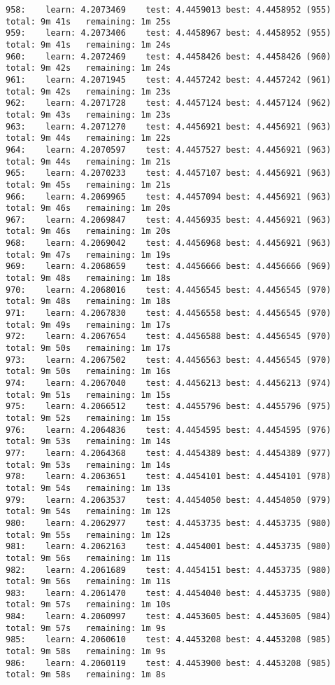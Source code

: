 \documentclass[11pt]{article}
\begin{document}
\begin{Verbatim}[commandchars=\\\{\}]
958:	learn: 4.2073469	test: 4.4459013	best: 4.4458952 (955)	total: 9m 41s	remaining: 1m 25s
959:	learn: 4.2073406	test: 4.4458967	best: 4.4458952 (955)	total: 9m 41s	remaining: 1m 24s
960:	learn: 4.2072469	test: 4.4458426	best: 4.4458426 (960)	total: 9m 42s	remaining: 1m 24s
961:	learn: 4.2071945	test: 4.4457242	best: 4.4457242 (961)	total: 9m 42s	remaining: 1m 23s
962:	learn: 4.2071728	test: 4.4457124	best: 4.4457124 (962)	total: 9m 43s	remaining: 1m 23s
963:	learn: 4.2071270	test: 4.4456921	best: 4.4456921 (963)	total: 9m 44s	remaining: 1m 22s
964:	learn: 4.2070597	test: 4.4457527	best: 4.4456921 (963)	total: 9m 44s	remaining: 1m 21s
965:	learn: 4.2070233	test: 4.4457107	best: 4.4456921 (963)	total: 9m 45s	remaining: 1m 21s
966:	learn: 4.2069965	test: 4.4457094	best: 4.4456921 (963)	total: 9m 46s	remaining: 1m 20s
967:	learn: 4.2069847	test: 4.4456935	best: 4.4456921 (963)	total: 9m 46s	remaining: 1m 20s
968:	learn: 4.2069042	test: 4.4456968	best: 4.4456921 (963)	total: 9m 47s	remaining: 1m 19s
969:	learn: 4.2068659	test: 4.4456666	best: 4.4456666 (969)	total: 9m 48s	remaining: 1m 18s
970:	learn: 4.2068016	test: 4.4456545	best: 4.4456545 (970)	total: 9m 48s	remaining: 1m 18s
971:	learn: 4.2067830	test: 4.4456558	best: 4.4456545 (970)	total: 9m 49s	remaining: 1m 17s
972:	learn: 4.2067654	test: 4.4456588	best: 4.4456545 (970)	total: 9m 50s	remaining: 1m 17s
973:	learn: 4.2067502	test: 4.4456563	best: 4.4456545 (970)	total: 9m 50s	remaining: 1m 16s
974:	learn: 4.2067040	test: 4.4456213	best: 4.4456213 (974)	total: 9m 51s	remaining: 1m 15s
975:	learn: 4.2066512	test: 4.4455796	best: 4.4455796 (975)	total: 9m 52s	remaining: 1m 15s
976:	learn: 4.2064836	test: 4.4454595	best: 4.4454595 (976)	total: 9m 53s	remaining: 1m 14s
977:	learn: 4.2064368	test: 4.4454389	best: 4.4454389 (977)	total: 9m 53s	remaining: 1m 14s
978:	learn: 4.2063651	test: 4.4454101	best: 4.4454101 (978)	total: 9m 54s	remaining: 1m 13s
979:	learn: 4.2063537	test: 4.4454050	best: 4.4454050 (979)	total: 9m 54s	remaining: 1m 12s
980:	learn: 4.2062977	test: 4.4453735	best: 4.4453735 (980)	total: 9m 55s	remaining: 1m 12s
981:	learn: 4.2062163	test: 4.4454001	best: 4.4453735 (980)	total: 9m 56s	remaining: 1m 11s
982:	learn: 4.2061689	test: 4.4454151	best: 4.4453735 (980)	total: 9m 56s	remaining: 1m 11s
983:	learn: 4.2061470	test: 4.4454040	best: 4.4453735 (980)	total: 9m 57s	remaining: 1m 10s
984:	learn: 4.2060997	test: 4.4453605	best: 4.4453605 (984)	total: 9m 57s	remaining: 1m 9s
985:	learn: 4.2060610	test: 4.4453208	best: 4.4453208 (985)	total: 9m 58s	remaining: 1m 9s
986:	learn: 4.2060119	test: 4.4453900	best: 4.4453208 (985)	total: 9m 58s	remaining: 1m 8s

\end{Verbatim}
\end{document}
